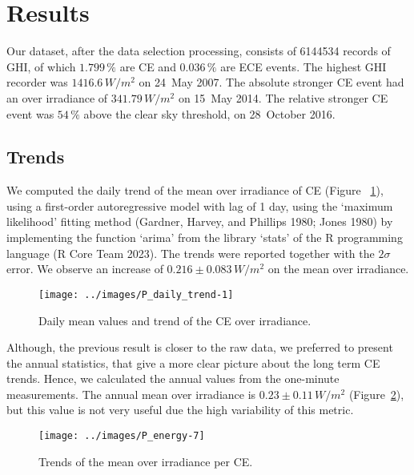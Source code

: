 \documentclass[
]{article}
\begin{document}
\FloatBarrier

\hypertarget{results}{%
\section{Results}\label{results}}

Our dataset, after the data selection processing, consists of
6144534 records of GHI, of which
\(1.799\,\%\) are CE and
\(0.036\,\%\) are ECE events.
The highest GHI recorder was
\(1416.6\,W/m^2\)
on 24~May 2007.
The absolute stronger CE event had an over irradiance of
\(341.79\,W/m^2\) on
15~May 2014.
The relative stronger CE event was
\(54\,\%\) above the
clear sky threshold, on
28~October 2016.

\hypertarget{trends}{%
\subsection{Trends}\label{trends}}

We computed the daily trend of the mean over irradiance of CE (Figure~
\ref{fig:CEmeanDaily}), using a first-order autoregressive model with lag of 1 day,
using the `maximum likelihood' fitting method (Gardner, Harvey, and Phillips 1980; Jones 1980) by
implementing the function `arima' from the library `stats' of the R programming
language (R Core Team 2023). The trends were reported together with the \(2\sigma\) error.
We observe an increase of
\(0.216\pm 0.083\,W/m^2\)
on the mean over irradiance.

\begin{figure}[h!]

{\centering \texttt{[image: ../images/P\_daily\_trend-1]} 

}

\caption{Daily mean values and trend of the CE over irradiance.}\label{fig:CEmeanDaily}
\end{figure}

Although, the previous result is closer to the raw data, we preferred to present the
annual statistics, that give a more clear picture about the long term CE trends.
Hence, we calculated the annual values from the one-minute measurements.
The annual mean over irradiance is
\(0.23\pm 0.11\,W/m^2\)
(Figure~\ref{fig:P-energy-mean}),
but this value is not very useful due the high
variability of this metric.

\begin{figure}[h!]

{\centering \texttt{[image: ../images/P\_energy-7]} 

}

\caption{Trends of the mean over irradiance per CE.}\label{fig:P-energy-mean}
\end{figure}
\end{document}
